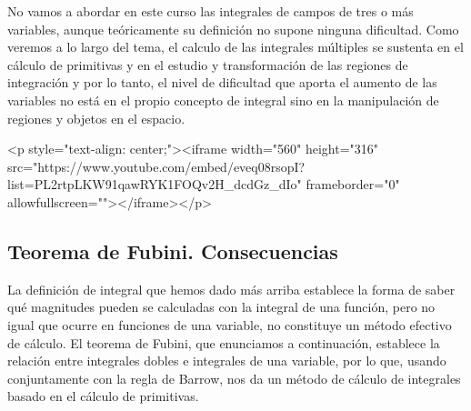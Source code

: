 No vamos a abordar en este curso las integrales de campos de tres o más variables, aunque teóricamente su definición no supone ninguna dificultad.
Como veremos a lo largo del tema, el calculo de las integrales múltiples se sustenta en el cálculo de primitivas y en el estudio y transformación de las regiones de integración y por lo tanto, el nivel de dificultad que aporta el aumento de las variables no está en el propio concepto de integral sino en la manipulación de regiones y objetos en el espacio.

\begin{rawhtml}
<p style="text-align: center;"><iframe width="560" height="316" src="https://www.youtube.com/embed/eveq08rsopI?list=PL2rtpLKW91qawRYK1FOQv2H_dcdGz_dIo" frameborder="0" allowfullscreen=""></iframe></p>
\end{rawhtml}

\subsection{Teorema de Fubini. Consecuencias}\label{ejs-fubini}

La definición de integral que hemos dado más arriba establece la forma de saber qué magnitudes pueden se calculadas con la integral de una función, pero no igual que ocurre en funciones de una variable, no constituye un método efectivo de cálculo.
El teorema de Fubini, que enunciamos a continuación, establece la relación entre integrales dobles e integrales de una variable, por lo que, usando conjuntamente con la regla de Barrow, nos da un método de cálculo de integrales basado en el cálculo de primitivas.

